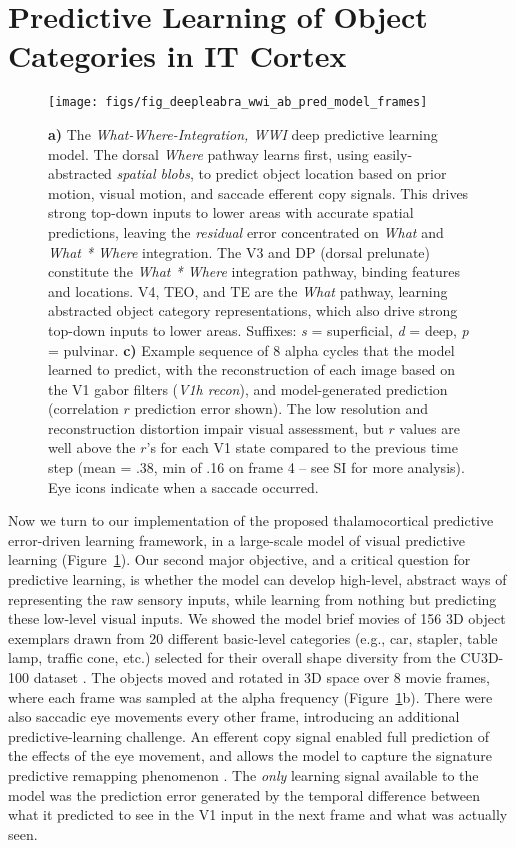 \documentclass[11pt,twoside]{article}
\newif\myifpdf
\begin{document}
\section{Predictive Learning of Object Categories in IT Cortex}

\begin{figure}
  \centering\texttt{[image: figs/fig\_deepleabra\_wwi\_ab\_pred\_model\_frames]}
  \caption{{\bf a)} The \emph{What-Where-Integration, WWI} deep predictive learning model. The dorsal \emph{Where} pathway learns first, using easily-abstracted \emph{spatial blobs}, to predict object location based on prior motion, visual motion, and saccade efferent copy signals.  This drives strong top-down inputs to lower areas with accurate spatial predictions, leaving the \emph{residual} error concentrated on \emph{What} and \emph{What * Where} integration.  The V3 and DP (dorsal prelunate) constitute the \emph{What * Where} integration pathway, binding features and locations.  V4, TEO, and TE are the \emph{What} pathway, learning abstracted object category representations, which also drive strong top-down inputs to lower areas.  Suffixes: \emph{s} = superficial, \emph{d} = deep, \emph{p} = pulvinar. {\bf c)} Example sequence of 8 alpha cycles that the model learned to predict, with the reconstruction of each image based on the V1 gabor filters (\emph{V1h recon}), and model-generated prediction (correlation $r$ prediction error shown).  The low resolution and reconstruction distortion impair visual assessment, but $r$ values are well above the $r$'s for each V1 state compared to the previous time step (mean = .38, min of .16 on frame 4 -- see SI for more analysis).  Eye icons indicate when a saccade occurred.}
  \label{fig.model}
\end{figure}

Now we turn to our implementation of the proposed thalamocortical predictive error-driven learning framework, in a large-scale model of visual predictive learning (Figure~\ref{fig.model}).  Our second major objective, and a critical question for predictive learning, is whether the model can develop high-level, abstract ways of representing the raw sensory inputs, while learning from nothing but predicting these low-level visual inputs.  We showed the model brief movies of 156 3D object exemplars drawn from 20 different basic-level categories (e.g., car, stapler, table lamp, traffic cone, etc.) selected for their overall shape diversity from the CU3D-100 dataset \citep{OReillyWyatteHerdEtAl13}.  The objects moved and rotated in 3D space over 8 movie frames, where each frame was sampled at the alpha frequency (Figure~\ref{fig.model}b).  There were also saccadic eye movements every other frame, introducing an additional predictive-learning challenge.  An efferent copy signal enabled full prediction of the effects of the eye movement, and allows the model to capture the signature predictive remapping phenomenon \citep{DuhamelColbyGoldberg92,CavanaghHuntAfrazEtAl10,NeupaneGuittonPack17}.  The \emph{only} learning signal available to the model was the prediction error generated by the temporal difference between what it predicted to see in the V1 input in the next frame and what was actually seen.
\end{document}

